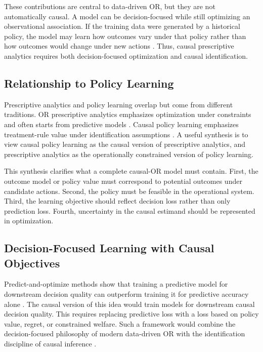 \documentclass[11pt]{article}
\begin{document}
These contributions are central to data-driven OR, but they are not automatically causal. A model can be decision-focused while still optimizing an observational association. If the training data were generated by a historical policy, the model may learn how outcomes vary under that policy rather than how outcomes would change under new actions \citep{fernandez2022causal,leporeni2023causally}. Thus, causal prescriptive analytics requires both decision-focused optimization and causal identification.

\subsection{Relationship to Policy Learning}

Prescriptive analytics and policy learning overlap but come from different traditions. OR prescriptive analytics emphasizes optimization under constraints and often starts from predictive models \citep{bertsimas2020predictive,misic2020data}. Causal policy learning emphasizes treatment-rule value under identification assumptions \citep{manski2004statistical,kitagawa2018treated,athey2021policy}. A useful synthesis is to view causal policy learning as the causal version of prescriptive analytics, and prescriptive analytics as the operationally constrained version of policy learning.

This synthesis clarifies what a complete causal-OR model must contain. First, the outcome model or policy value must correspond to potential outcomes under candidate actions. Second, the policy must be feasible in the operational system. Third, the learning objective should reflect decision loss rather than only prediction loss. Fourth, uncertainty in the causal estimand should be represented in optimization.

\subsection{Decision-Focused Learning with Causal Objectives}

Predict-and-optimize methods show that training a predictive model for downstream decision quality can outperform training it for predictive accuracy alone \citep{elmachtoub2022smart}. The causal version of this idea would train models for downstream causal decision quality. This requires replacing predictive loss with a loss based on policy value, regret, or constrained welfare. Such a framework would combine the decision-focused philosophy of modern data-driven OR with the identification discipline of causal inference \citep{bertsimas2020predictive,athey2021policy}.
\end{document}
